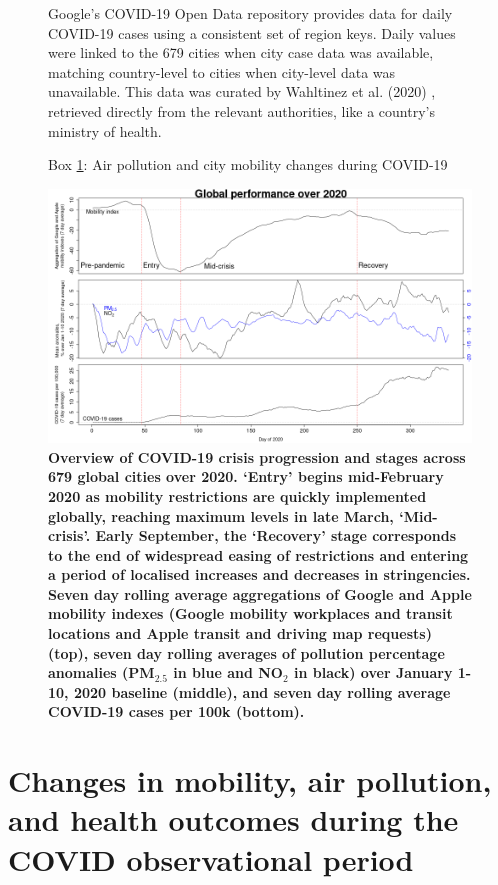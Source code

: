 \documentclass[preprint,10pt]{elsarticle} %
\begin{document}
\begin{figure}
{{Google's COVID-19 Open Data repository\cite{Google2022} provides data for daily COVID-19 cases using a consistent set of region keys. Daily values were linked to the 679 cities when city case data was available, matching country-level to cities when city-level data was unavailable. This data was curated by Wahltinez et al. (2020) \citep{Wahltinez2020}, retrieved directly from the relevant authorities, like a country's ministry of health.

}}
\captionsetup{labelformat=empty}
\caption{Box \ref{box:pollution}: Air pollution and city mobility changes during COVID-19}\label{box:pollution}
\end{figure}




\begin{figure}
\centering
\includegraphics[trim={0 0 15 20},clip,scale=0.45]{Images/LancetPHOverall.png}
\caption{\bf Overview of COVID-19 crisis progression and stages across 679 global cities over 2020. `Entry' begins mid-February 2020 as mobility restrictions are quickly implemented globally, reaching maximum levels in late March, `Mid-crisis'. Early September, the `Recovery' stage corresponds to the end of widespread easing of restrictions and entering a period of localised increases and decreases in stringencies. Seven day rolling average aggregations of Google and Apple mobility indexes (Google mobility workplaces and transit locations and Apple transit and driving map requests) (top), seven day rolling averages of pollution percentage anomalies (PM$_{2.5}$ in blue and NO$_{2}$ in black) over January 1-10, 2020 baseline (middle), and seven day rolling average COVID-19 cases per 100k (bottom).}
 \label{fig:stages}
\end{figure}

\section*{\textcolor{OliveGreen}{Changes in mobility, air pollution, and health outcomes during the COVID observational period}}
\end{document}
